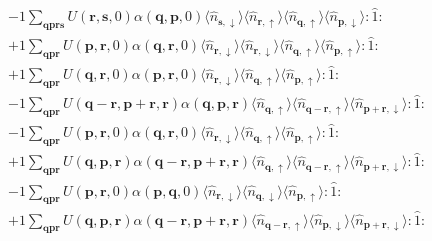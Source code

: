 \begin{align*}
	&-1 \sum_{ \mathbf{q} \mathbf{p} \mathbf{r} \mathbf{s} } U( \mathbf{r}, \mathbf{s}, 0 )  \alpha( \mathbf{q}, \mathbf{p}, 0 )   \langle \hat{n}_{ \mathbf{s}, \downarrow } \rangle \langle \hat{n}_{ \mathbf{r}, \uparrow } \rangle \langle \hat{n}_{ \mathbf{q}, \uparrow } \rangle \langle \hat{n}_{ \mathbf{p}, \downarrow } \rangle : \hat{1} : \\
	&+1 \sum_{ \mathbf{q} \mathbf{p} \mathbf{r} } U( \mathbf{p}, \mathbf{r}, 0 )  \alpha( \mathbf{q}, \mathbf{r}, 0 )   \langle \hat{n}_{ \mathbf{r}, \downarrow } \rangle \langle \hat{n}_{ \mathbf{r}, \downarrow } \rangle \langle \hat{n}_{ \mathbf{q}, \uparrow } \rangle \langle \hat{n}_{ \mathbf{p}, \uparrow } \rangle : \hat{1} : \\
	&+1 \sum_{ \mathbf{q} \mathbf{p} \mathbf{r} } U( \mathbf{q}, \mathbf{r}, 0 )  \alpha( \mathbf{p}, \mathbf{r}, 0 )   \langle \hat{n}_{ \mathbf{r}, \downarrow } \rangle \langle \hat{n}_{ \mathbf{q}, \uparrow } \rangle \langle \hat{n}_{ \mathbf{p}, \uparrow } \rangle : \hat{1} : \\
	&-1 \sum_{ \mathbf{q} \mathbf{p} \mathbf{r} } U( \mathbf{q}-\mathbf{r}, \mathbf{p}+\mathbf{r}, \mathbf{r} )  \alpha( \mathbf{q}, \mathbf{p}, \mathbf{r} )   \langle \hat{n}_{ \mathbf{q}, \uparrow } \rangle \langle \hat{n}_{ \mathbf{q}-\mathbf{r}, \uparrow } \rangle \langle \hat{n}_{ \mathbf{p}+\mathbf{r}, \downarrow } \rangle : \hat{1} : \\
	&-1 \sum_{ \mathbf{q} \mathbf{p} \mathbf{r} } U( \mathbf{p}, \mathbf{r}, 0 )  \alpha( \mathbf{q}, \mathbf{r}, 0 )   \langle \hat{n}_{ \mathbf{r}, \downarrow } \rangle \langle \hat{n}_{ \mathbf{q}, \uparrow } \rangle \langle \hat{n}_{ \mathbf{p}, \uparrow } \rangle : \hat{1} : \\
	&+1 \sum_{ \mathbf{q} \mathbf{p} \mathbf{r} } U( \mathbf{q}, \mathbf{p}, \mathbf{r} )  \alpha( \mathbf{q}-\mathbf{r}, \mathbf{p}+\mathbf{r}, \mathbf{r} )   \langle \hat{n}_{ \mathbf{q}, \uparrow } \rangle \langle \hat{n}_{ \mathbf{q}-\mathbf{r}, \uparrow } \rangle \langle \hat{n}_{ \mathbf{p}+\mathbf{r}, \downarrow } \rangle : \hat{1} : \\
	&-1 \sum_{ \mathbf{q} \mathbf{p} \mathbf{r} } U( \mathbf{p}, \mathbf{r}, 0 )  \alpha( \mathbf{p}, \mathbf{q}, 0 )   \langle \hat{n}_{ \mathbf{r}, \downarrow } \rangle \langle \hat{n}_{ \mathbf{q}, \downarrow } \rangle \langle \hat{n}_{ \mathbf{p}, \uparrow } \rangle : \hat{1} : \\
	&+1 \sum_{ \mathbf{q} \mathbf{p} \mathbf{r} } U( \mathbf{q}, \mathbf{p}, \mathbf{r} )  \alpha( \mathbf{q}-\mathbf{r}, \mathbf{p}+\mathbf{r}, \mathbf{r} )   \langle \hat{n}_{ \mathbf{q}-\mathbf{r}, \uparrow } \rangle \langle \hat{n}_{ \mathbf{p}, \downarrow } \rangle \langle \hat{n}_{ \mathbf{p}+\mathbf{r}, \downarrow } \rangle : \hat{1} : \\

\end{align*}
